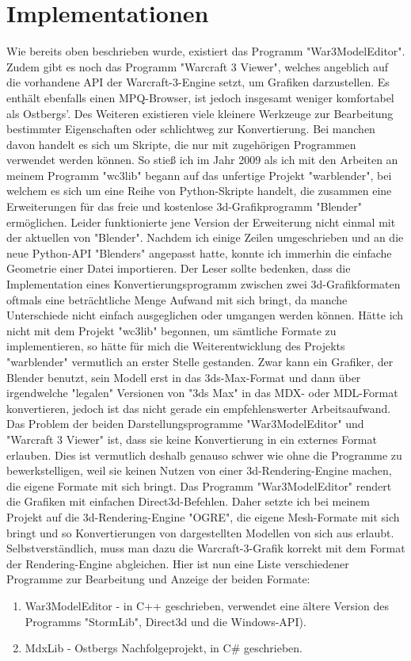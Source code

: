 \section{Implementationen}
Wie bereits oben beschrieben wurde, existiert das Programm "War3ModelEditor". Zudem gibt es noch das Programm "Warcraft 3 Viewer", welches angeblich auf die vorhandene API der Warcraft-3-Engine
setzt, um Grafiken darzustellen.
Es enthält ebenfalls einen MPQ-Browser, ist jedoch insgesamt weniger komfortabel als Ostbergs'.
Des Weiteren existieren viele kleinere Werkzeuge zur Bearbeitung bestimmter Eigenschaften oder schlichtweg zur Konvertierung.
Bei manchen davon handelt es sich um Skripte, die nur mit zugehörigen Programmen verwendet werden können.
So stieß ich im Jahr 2009 als ich mit den Arbeiten an meinem Programm "wc3lib" begann auf das unfertige
Projekt "warblender", bei welchem es sich um eine Reihe von Python-Skripte handelt, die zusammen eine
Erweiterungen für das freie und kostenlose 3d-Grafikprogramm "Blender" ermöglichen.
Leider funktionierte jene Version der Erweiterung nicht einmal mit der aktuellen von "Blender". Nachdem
ich einige Zeilen umgeschrieben und an die neue Python-API "Blenders" angepasst hatte, konnte ich immerhin
die einfache Geometrie einer Datei importieren.
Der Leser sollte bedenken, dass die Implementation eines Konvertierungsprogramm zwischen zwei 3d-Grafikformaten oftmals
eine beträchtliche Menge Aufwand mit sich bringt, da manche Unterschiede nicht einfach ausgeglichen oder umgangen
werden können.
Hätte ich nicht mit dem Projekt "wc3lib" begonnen, um sämtliche Formate zu implementieren, so hätte für mich die Weiterentwicklung des Projekts "warblender"
vermutlich an erster Stelle gestanden.
Zwar kann ein Grafiker, der Blender benutzt, sein Modell erst in das 3ds-Max-Format und dann über irgendwelche "legalen" Versionen von "3ds Max" in das MDX- oder MDL-Format
konvertieren, jedoch ist das nicht gerade ein empfehlenswerter Arbeitsaufwand.
Das Problem der beiden Darstellungsprogramme "War3ModelEditor" und "Warcraft 3 Viewer" ist, dass sie keine
Konvertierung in ein externes Format erlauben. Dies ist vermutlich deshalb genauso schwer wie ohne die Programme zu bewerkstelligen,
weil sie keinen Nutzen von einer 3d-Rendering-Engine machen, die eigene Formate mit sich bringt.
Das Programm "War3ModelEditor" rendert die Grafiken mit einfachen Direct3d-Befehlen.
Daher setzte ich bei meinem Projekt auf die 3d-Rendering-Engine "OGRE", die eigene Mesh-Formate mit sich bringt und so
Konvertierungen von dargestellten Modellen von sich aus erlaubt.
Selbstverständlich, muss man dazu die Warcraft-3-Grafik korrekt mit dem Format der Rendering-Engine abgleichen.
Hier ist nun eine Liste verschiedener Programme zur Bearbeitung und Anzeige der beiden Formate:
\begin{enumerate}
\item War3ModelEditor - in C++ geschrieben, verwendet eine ältere Version des Programms "StormLib", Direct3d und die Windows-API).
\item MdxLib - Ostbergs Nachfolgeprojekt, in C# geschrieben.
\end{enumerate}

